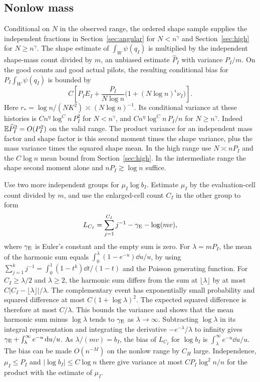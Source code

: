 \subsection{Nonlow mass}
Conditional on \(N\) in the observed range, the ordered
shape sample supplies the independent fractions in
Section~\ref{sec:angular} for \(N<n^\gamma\) and
Section~\ref{sec:high} for \(N\ge n^\gamma\).
The shape estimate of \(\int_W\psi(q_I)\) is multiplied
by the independent shape-mass count divided by \(m\), an
unbiased estimate \(\widehat P_I\) with variance \(P_I/m\).
On the good counts and good actual pilots, the resulting
conditional bias for \(P_I\int_W\psi(q_I)\) is bounded by
\begin{equation}\label{eq:mass-shape-bias}
 C\left[P_I E_I+\frac{P_I}{N\log n}
       \bigl(1+(N\log n)^\epsilon\nu_I\bigr)\right].
\end{equation}
Here \(r_*=\log n/(NK^2)\asymp (N\log n)^{-1}\).
Its conditional variance at these histories is
\(C n^\eta\log^C n\, P_I^2\) for \(N<n^\gamma\), and
\(C n^\eta\log^C n\,P_I/n\) for \(N\ge n^\gamma\).
Indeed \(\mathbb E\widehat P_I^2=O(P_I^2)\) on the valid
range. The product variance for an independent mass factor
and shape factor is this second moment times the shape
variance, plus the mass variance times the squared shape
mean. In the high range use \(N\asymp nP_I\) and the
\(C\log n\) mean bound from Section~\ref{sec:high}.
In the intermediate range the shape second moment alone
and \(nP_I\gtrsim\log n\) suffice.

Use two more independent groups for \(\mu_I\log b_I\).
Estimate \(\mu_I\) by the evaluation-cell count divided by
\(m\), and use the enlarged-cell count \(C_I\) in the
other group to form
\[
 L_{C_I}=\sum_{j=1}^{C_I}j^{-1}-\gamma_{\rm E}-\log(mv),
\]
where \(\gamma_{\rm E}\) is Euler's constant and the empty
sum is zero. For \(\lambda=mP_I\), the mean of the harmonic
sum equals \(\int_0^\lambda(1-e^{-u})\dd u/u\), by using
\(\sum_{j=1}^k j^{-1}=\int_0^1 (1-t^k)\dd t/(1-t)\)
and the Poisson generating function. For \(C_I\ge\lambda/2\) and \(\lambda\ge2\),
the harmonic sum differs from the sum at \(\lfloor\lambda\rfloor\)
by at most \(C|C_I-\lfloor\lambda\rfloor|/\lambda\).
The complementary event has exponentially small probability
and squared difference at most \(C(1+\log\lambda)^2\).
The expected squared difference is therefore at most \(C/\lambda\).
This bounds the variance and shows that the mean harmonic sum
minus \(\log\lambda\) tends to \(\gamma_{\rm E}\) as
\(\lambda\to\infty\). Subtracting \(\log\lambda\) in its
integral representation and integrating the derivative
\(-e^{-\lambda}/\lambda\) to infinity gives
\(\gamma_{\rm E}+\int_\lambda^\infty e^{-u}\,\mathrm d u/u\).
As \(\lambda/(mv)=b_I\), the bias of \(L_{C_I}\) for \(\log b_I\)
is \(\int_\lambda^\infty e^{-u}\dd u/u\).
The bias can be made \(O(n^{-M})\) on the nonlow range
by \(C_H\) large. Independence, \(\mu_I\le P_I\) and
\(|\log b_I|\le C\log n\) there give variance at most
\(C P_I\log^2 n/n\) for the product with the estimate of
\(\mu_I\).

